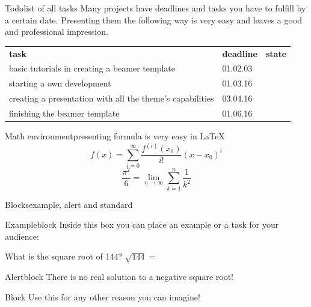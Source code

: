 \documentclass[
	12pt, 				%
	t,					%
	aspectratio=169,	%
	]{beamer}
\begin{document}
	
	\begin{frame}{Todo}{list of all tasks}
		Many projects have deadlines and tasks you have to fulfill by a certain date.
		Presenting them the following way is very easy and leaves a good and professional impression.
		\vfill
		\begin{tabularx}{\textwidth}{Xll}
			\textbf{task} & \textbf{deadline} & \textbf{state}\\
			basic tutorials in creating a beamer template & 01.02.03 & \myCheck \\
			starting a own development & 01.03.16 & \myCheck \\
			creating a presentation with all the theme's capabilities & 03.04.16 & \myCheck \\
			finishing the beamer template & 01.06.16 & \myUnCheck\\
		\end{tabularx}
		\vfill
	\end{frame}
	
	
	\begin{frame}{Math environment}{presenting formula is very easy in \LaTeX}
		\vfill
		\begin{equation*}
			f(x)=\sum_{i=0}^\infty \frac{f^{(i)}(x_0)}{i!}(x-x_0)^i
		\end{equation*}
		\vfill
		\begin{equation*}
			\displaystyle\frac{\pi^2}{6}=\lim_{n \to \infty}\sum_{k=1}^n \frac{1}{k^2}
		\end{equation*}
		\vfill
	\end{frame}
	
	
	\begin{frame}{Blocks}{example, alert and standard}
	    \begin{exampleblock}{Exampleblock}
			Inside this box you can place an example or a task for your audience:
			
			What is the square root of 144? $\sqrt{144} = $
		\end{exampleblock}
		\begin{alertblock}{Alertblock}			
			There is no real solution to a negative square root!
		\end{alertblock}
		\begin{block}{Block}
			Use this for any other reason you can imagine!
		\end{block}
	\end{frame}
	
\end{document}
